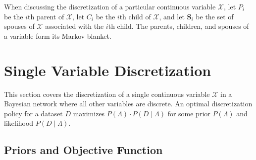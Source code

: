 \documentclass[twoside,11pt]{article}
\newcommand{\brock}[1]{\mathopen{}\mathclose\bgroup\left[#1\aftergroup\egroup\right]}
\newcommand{\cX}{\mathcal{X}} %
\begin{document}
When discussing the discretization of a particular continuous variable $\cX$, let $P_i$ be the $i$th parent of $\cX$, let $C_i$ be the $i$th child of $\cX$, and let $\bm{S}_i$ be the set of spouses of $\cX$ associated with the $i$th child. The parents, children, and spouses of a variable form its Markov blanket.


\section{Single Variable Discretization}
\label{sec:single_var}

This section covers the discretization of a single continuous variable $\cX$ in a Bayesian network where all other variables are discrete.
An optimal discretization policy for a dataset $D$ maximizes $P(\Lambda)\cdot P(D\mid \Lambda)$ for some prior $P(\Lambda)$ and likelihood $P(D\mid \Lambda)$.





\subsection{Priors and Objective Function}
\end{document}
